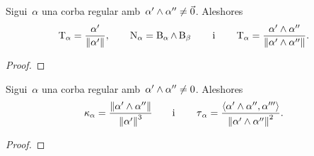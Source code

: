 \documentclass[../../main.tex]{subfiles}
\begin{document}
	\begin{proposition}
		\label{prop:triedre de frenet d'una corba regular}
		\label{prop:tangent d'una corba regular}
		\label{prop:normal d'una corba regular}
		\label{prop:binormal d'una corba regular}
		Sigui~\(\alpha\) una corba regular amb~\(\alpha'\mathbin{\wedge}\alpha''\neq\vec{0}\).
		Aleshores
		\[
		    \tangent_{\alpha}=\frac{\alpha'}{\norm{\alpha'}},\qquad\normal_{\alpha}=\binormal_{\alpha}\prodvec\binormal_{\beta}\qquad\text{i}\qquad\tangent_{\alpha}=\frac{\alpha'\prodvec\alpha''}{\norm{\alpha'\prodvec\alpha''}}.
		\]
		\begin{proof}
		\end{proof}
	\end{proposition}
	\begin{proposition}
		\label{prop:curvatura i torsió d'una corba regular}
		\label{prop:curvatura d'una corba regular}
		\label{prop:torsió d'una corba regular}
		Sigui~\(\alpha\) una corba regular amb~\(\alpha'\mathbin{\wedge}\alpha''\neq0\).
		Aleshores
		\[
		    \curvatura_{\alpha}=\frac{\norm{\alpha'\prodvec\alpha''}}{\norm{\alpha'}^{3}}\qquad\text{i}\qquad\torsio_{\alpha}=\frac{\prodesc{\alpha'\prodvec\alpha''}{\alpha'''}}{\norm{\alpha'\prodvec\alpha''}^{2}}.
		\]
		\begin{proof}
		\end{proof}
	\end{proposition}
\end{document}
